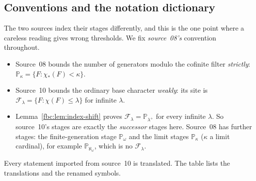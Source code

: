 \documentclass[11pt,letterpaper]{article}
\theoremstyle{definition}
\theoremstyle{remark}
\newcommand{\om}{\omega}
\newcommand{\PP}{\mathbb P}
\begin{document}
\subsection{Conventions and the notation dictionary}
\label{fbc:sec:notation}
The two sources index their stages differently, and this is the one
point where a careless reading gives wrong thresholds. We fix
\emph{source~08's} convention throughout.
\begin{itemize}
\item Source~08 bounds the number of generators modulo the cofinite
filter \emph{strictly}: $\PP_\kappa=\{F:\chi_*(F)<\kappa\}$.
\item Source~10 bounds the ordinary base character \emph{weakly}:
its site is $\mathcal F_\lambda=\{F:\chi(F)\leq\lambda\}$ for infinite
$\lambda$.
\item Lemma~\ref{fbc:lem:index-shift} proves
$\mathcal F_\lambda=\PP_{\lambda^+}$ for every infinite $\lambda$. So
source~10's stages are exactly the \emph{successor} stages here.
Source~08 has further stages: the finite-generation stage $\PP_\om$ and
the limit stages $\PP_\kappa$ ($\kappa$ a limit cardinal), for example
$\PP_{\aleph_\om}$, which is no $\mathcal F_\lambda$.
\end{itemize}
Every statement imported from source~10 is translated. The table lists
the translations and the renamed symbols.
\end{document}
